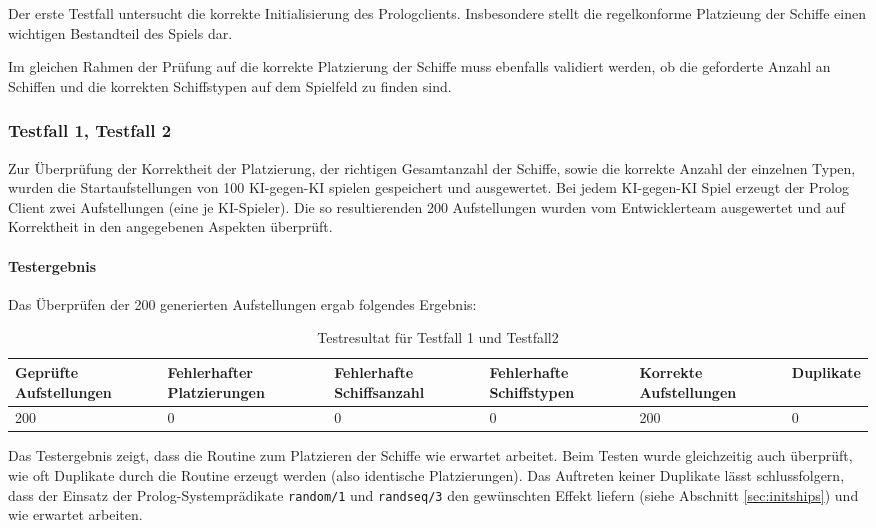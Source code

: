 	
	Der erste Testfall untersucht die korrekte Initialisierung des Prologclients. Insbesondere stellt die regelkonforme Platzieung der
	Schiffe einen wichtigen Bestandteil des Spiels dar. 
	
	Im gleichen Rahmen der Prüfung auf die korrekte Platzierung der Schiffe muss ebenfalls validiert werden, ob die geforderte Anzahl an Schiffen und die
	korrekten Schiffstypen auf dem Spielfeld zu finden sind.

	\subsubsection{Testfall 1, Testfall 2} %
	\label{ssub:testfall_1_testfall_2}
		Zur Überprüfung der Korrektheit der Platzierung, der richtigen Gesamtanzahl der Schiffe, sowie die korrekte Anzahl der einzelnen Typen, wurden 
		die Startaufstellungen von 100 KI-gegen-KI spielen gespeichert und ausgewertet. Bei jedem KI-gegen-KI Spiel erzeugt der Prolog Client zwei 
		Aufstellungen (eine je KI-Spieler). Die so resultierenden 200 Aufstellungen wurden vom Entwicklerteam ausgewertet und auf Korrektheit in den 
		angegebenen Aspekten überprüft.
		
		\paragraph{Testergebnis} %
		\label{par:testergebnis}
			Das Überprüfen der 200 generierten Aufstellungen ergab folgendes Ergebnis:
			\begin{table}[H] %
				\centering
				\begin{tabular}{|p{.16\textwidth}|p{}|p{}|p{}|p{}|p{}|} 
					\hline
					Geprüfte Aufstellungen & Fehlerhafter Platzierungen &Fehlerhafte Schiffsanzahl&Fehlerhafte Schiffstypen&Korrekte Aufstellungen&Duplikate\\ 
					\hline\hline
					200 & 0 & 0 & 0 & 200 & 0\\
					\hline
				\end{tabular}
				\caption{Testresultat für Testfall 1 und Testfall2}
				\label{tbl:tf1tf2}
			\end{table}
		Das Testergebnis zeigt, dass die Routine zum Platzieren der Schiffe wie erwartet arbeitet. Beim Testen wurde gleichzeitig auch überprüft, 
		wie oft Duplikate durch die Routine erzeugt werden (also identische Platzierungen).
		Das Auftreten keiner Duplikate lässt schlussfolgern, dass der Einsatz der Prolog-Systemprädikate \texttt{random/1} und \texttt{randseq/3} 
		den gewünschten Effekt liefern (siehe Abschnitt \ref{sec:initships}) und wie erwartet arbeiten.
		
